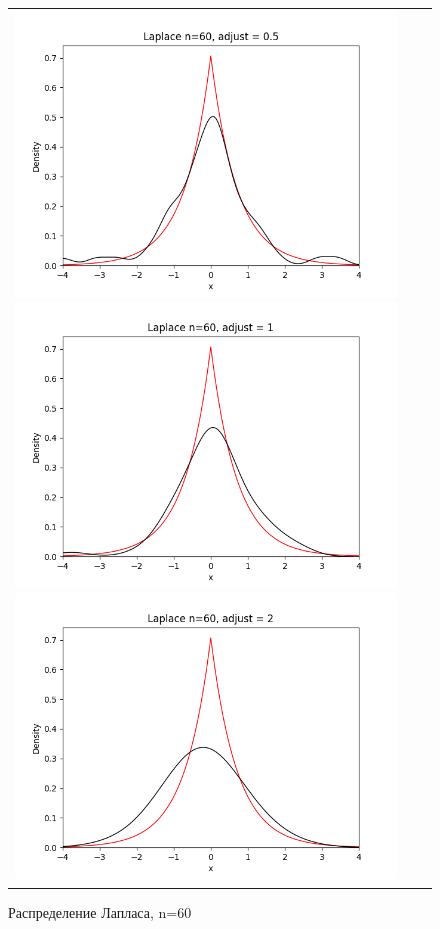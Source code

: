 \begin{figure}[H]
	\begin{tabular}{ccc}
		\includegraphics[scale=0.33]{laplace_n60_adjust0.5.png} 
		\includegraphics[scale=0.33]{laplace_n60_adjust1.png}
		\includegraphics[scale=0.33]{laplace_n60_adjust2.png}
	\end{tabular}
	\caption{Распределение Лапласа, n=60}
\end{figure}


